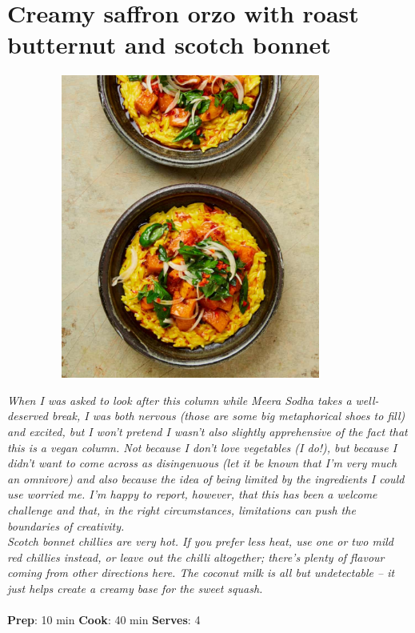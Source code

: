 \documentclass{book}
\begin{document}
\section{Creamy saffron orzo with roast butternut and scotch bonnet}
\begin{figure}
\centering\includegraphics[width=10cm,height=10cm,keepaspectratio]{Recipe_Pictures/Creamy_saffron_orzo_with_roast_butternut_and_scotch_bonnet.png}
\end{figure}
\emph{When I was asked to look after this column while Meera Sodha takes a well-deserved break, I was both nervous (those are some big metaphorical shoes to fill) and excited, but I won’t pretend I wasn’t also slightly apprehensive of the fact that this is a vegan column. Not because I don’t love vegetables (I do!), but because I didn’t want to come across as disingenuous (let it be known that I’m very much an omnivore) and also because the idea of being limited by the ingredients I could use worried me. I’m happy to report, however, that this has been a welcome challenge and that, in the right circumstances, limitations can push the boundaries of creativity.\\ 
Scotch bonnet chillies are very hot. If you prefer less heat, use one or two mild red chillies instead, or leave out the chilli altogether; there’s plenty of flavour coming from other directions here. The coconut milk is all but undetectable – it just helps create a creamy base for the sweet squash.}\\\\ 
\textbf{Prep}: 10 min
\textbf{Cook}: 40 min
\textbf{Serves}: 4
\end{document}
